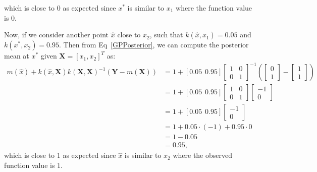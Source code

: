 which is close to $0$ as expected since $x^*$ is similar to $x_1$ where the function value is $0$.

Now, if we consider another point $\hat{x}$ close to $x_2$, such that $k(\hat{x}, x_1)=0.05$ and $k(x^*, x_2)=0.95$. Then from Eq~\ref{GPPosterior}, we can compute the posterior mean at $x^*$ given $\mathbf{X}=[x_1, x_2]^T$ as:
{\small\begingroup
\renewcommand{\arraystretch}{1.25}
\setlength\arraycolsep{2.5pt}
\begin{align}
    m\left(\hat{x}\right)+k\left(\hat{x}, \mathbf{X}\right) k\left(\mathbf{X}, \mathbf{X}\right)^{-1}\left(\mathbf{Y}-m\left(\mathbf{X}\right)\right) & = 1 + [0.05 \hspace{5pt} 0.95] \left[\begin{array}{cc}
        1 & 0 \\
        0 & 1
    \end{array}\right]^{-1} \left(\left[\begin{array}{c}
        0\\
        1
        \end{array}\right] -
        \left[\begin{array}{c}
        1\\
        1
        \end{array}\right]
        \right)\\
        &= 1 + [0.05 \hspace{5pt} 0.95] \left[\begin{array}{cc}
        1 & 0 \\
        0 & 1
    \end{array}\right] \left[\begin{array}{c}
        -1\\
        0
        \end{array}\right]\\
        &= 1 + [0.05 \hspace{5pt} 0.95] \left[\begin{array}{c}
        -1\\
        0
        \end{array}\right]\\
        &= 1 + 0.05\cdot (-1) + 0.95 \cdot 0\\
        &= 1 -0.05\\
        &= 0.95,
\end{align}
\endgroup
}
which is close to $1$ as expected since $\hat{x}$ is similar to $x_2$ where the observed function value is $1$.

